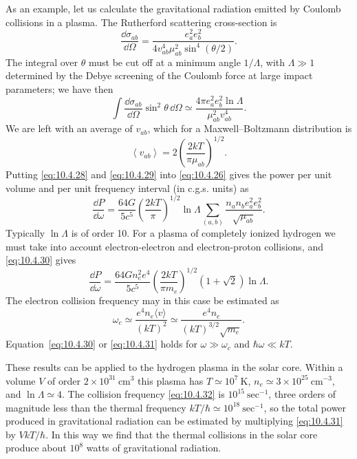 As an example, let us calculate the gravitational radiation emitted by
Coulomb collisions in a plasma. The Rutherford scattering cross-section is
\begin{equation}
  \frac{\dd\sigma_{ab}}{\dd\Omega}
  =
  \frac{e_a^2e_b^2}
       {4v_{ab}^4\mu_{ab}^2\sin^4(\theta/2)}.
  \tag{10.4.27}\label{eq:10.4.27}
\end{equation}
The integral over \(\theta\) must be cut off at a minimum angle
\(1/\Lambda\), with \(\Lambda\gg1\) determined by the Debye screening of
the Coulomb force at large impact parameters; we have then
\begin{equation}
  \int\frac{\dd\sigma_{ab}}{\dd\Omega}\sin^2\theta\,\dd\Omega
  \simeq
  \frac{4\pi e_a^2e_b^2\ln\Lambda}
       {\mu_{ab}^2v_{ab}^4}.
  \tag{10.4.28}\label{eq:10.4.28}
\end{equation}
We are left with an average of \(v_{ab}\), which for a Maxwell--Boltzmann
distribution is
\begin{equation}
  \left\langle v_{ab}\right\rangle
  =
  2\left(\frac{2kT}{\pi\mu_{ab}}\right)^{1/2}.
  \tag{10.4.29}\label{eq:10.4.29}
\end{equation}
Putting \eqref{eq:10.4.28} and \eqref{eq:10.4.29} into
\eqref{eq:10.4.26} gives the power per unit volume and per unit frequency
interval (in c.g.s. units) as
\begin{equation}
  \frac{\dd P}{\dd\omega}
  =
  \frac{64G}{5c^5}
  \left(\frac{2kT}{\pi}\right)^{1/2}
  \ln\Lambda
  \sum_{(a,b)}
  \frac{n_an_be_a^2e_b^2}{\sqrt{\mu_{ab}}}.
  \tag{10.4.30}\label{eq:10.4.30}
\end{equation}
Typically \(\ln\Lambda\) is of order 10. For a plasma of completely ionized
hydrogen we must take into account electron-electron and electron-proton
collisions, and \eqref{eq:10.4.30} gives
\begin{equation}
  \frac{\dd P}{\dd\omega}
  =
  \frac{64Gn_e^2e^4}{5c^5}
  \left(\frac{2kT}{\pi m_e}\right)^{1/2}
  (1+\sqrt2)\ln\Lambda.
  \tag{10.4.31}\label{eq:10.4.31}
\end{equation}
The electron collision frequency may in this case be estimated as
\begin{equation}
  \omega_c
  \simeq
  \frac{e^4n_e\langle v\rangle}{(kT)^2}
  \simeq
  \frac{e^4n_e}{(kT)^{3/2}\sqrt{m_e}}.
  \tag{10.4.32}\label{eq:10.4.32}
\end{equation}
Equation~\eqref{eq:10.4.30} or \eqref{eq:10.4.31} holds for
\(\omega\gg\omega_c\) and \(\hbar\omega\ll kT\).

These results can be applied to the hydrogen plasma in the solar core. Within
a volume \(V\) of order \(2\times10^{31}\ \mathrm{cm}^3\) this plasma has
\(T\simeq10^7\ {\mathrm{K}}\), \(n_e\simeq3\times10^{25}\ \mathrm{cm}^{-3}\),
and \(\ln\Lambda\simeq4\). The collision frequency \eqref{eq:10.4.32} is
\(10^{15}\ \mathrm{sec}^{-1}\), three orders of magnitude less than the
thermal frequency \(kT/\hbar\simeq10^{18}\ \mathrm{sec}^{-1}\), so the total
power produced in gravitational radiation can be estimated by multiplying
\eqref{eq:10.4.31} by \(VkT/\hbar\). In this way we find that the thermal
collisions in the solar core produce about \(10^8\) watts of gravitational
radiation.

